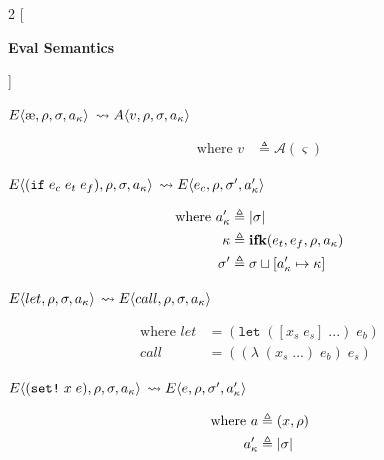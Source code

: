 \documentclass[12pt,draft]{article}
\newcommand\mae{\ensuremath{\text{\ae}}}
\newcommand{\ifsyn}[3]{(\texttt{if}\;#1\;#2\;#3)}
\newcommand{\setsyn}[2]{(\texttt{set!}\;#1\;#2)}
\newcommand{\E}[4]{E\langle #1 , #2 , #3 , #4 \rangle}
\newcommand{\A}[4]{A\langle #1 , #2 , #3 , #4 \rangle}
\begin{document}
\begin{multicols*}{2}
  [
  \begin{center}
    \textbf{Eval Semantics}
  \end{center}
  ]
  \begin{center}
    $\E{\mae}{\cenv}{\cstore}{\ckaddr}$
    $\leadsto \A{v}{\cenv}{\cstore}{\ckaddr}$
  \end{center}
  \vspace{-7mm}
  \begin{align*}
    \text{where } v &\triangleq \mathcal{A}(\varsigma)
  \end{align*}
  \begin{center}
    $\E{\ifsyn{e_c}{e_t}{e_f}}{\cenv}{\cstore}{\ckaddr}$
    $\leadsto \E{e_c}{\cenv}{\cstore'}{\ckaddr'}$
  \end{center}
  \vspace{-7mm}
  \begin{align*}
    \text{where }
    a_{\kappa}' &\triangleq |\sigma| \\
    \kappa &\triangleq \textbf{ifk}(e_t , e_f , \rho , a_{\kappa}) \\
    \sigma' &\triangleq \sigma \sqcup [a_{\kappa}' \mapsto \kappa]
  \end{align*}
  \begin{center}
    $\E{let}{\cenv}{\cstore}{\ckaddr}$
    $\leadsto \E{call}{\cenv}{\cstore}{\ckaddr}$
  \end{center}
  \vspace{-7mm}
  \begin{align*}
    \text{where }
    let &= (\texttt{let} \; ([x_s \; e_s] \; ...) \; e_b) \\
    call &= ((\lambda \; (x_s \; ...) \; e_b) \; e_s)
  \end{align*}
  \begin{center}
    $\E{\setsyn{x}{e}}{\cenv}{\cstore}{\ckaddr}$
    $\leadsto \E{e}{\cenv}{\cstore'}{\ckaddr'}$
  \end{center}
  \vspace{-7mm}
  \begin{align*}
    \text{where }
    a &\triangleq (x , \cenv) \\
    \ckaddr' &\triangleq |\cstore| \\

\end{align*}
\end{multicols*}
\end{document}
